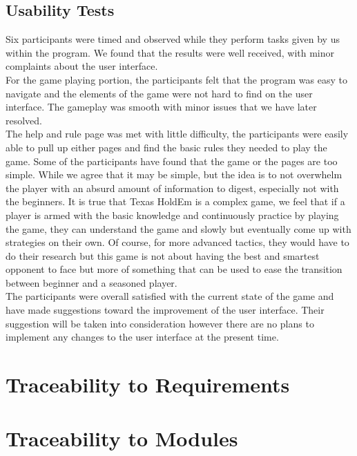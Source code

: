 \documentclass[11pt]{article}
\begin{document}
	\subsection{Usability Tests}
	Six participants were timed and observed while they perform tasks given by us within the program. We found that the results were well received, with minor complaints about the user interface. \\
	\newline
	For the game playing portion, the participants felt that the program was easy to navigate and the elements of the game were not hard to find on the user interface. The gameplay was smooth with minor issues that we have later resolved. \\
	\newline
	The help and rule page was met with little difficulty, the participants were easily able to pull up either pages and find the basic rules they needed to play the game. Some of the participants have found that the game or the pages are too simple. While we agree that it may be simple, but the idea is to not overwhelm the player with an absurd amount of information to digest, especially not with the beginners. It is true that Texas HoldEm is a complex game, we feel that if a player is armed with the basic knowledge and continuously practice by playing the game, they can understand the game and slowly but eventually come up with strategies on their own. Of course, for more advanced tactics, they would have to do their research but this game is not about having the best and smartest opponent to face but more of something that can be used to ease the transition between beginner and a seasoned player. \\
	\newline 
	The participants were overall satisfied with the current state of the game and have made suggestions toward the improvement of the user interface. Their suggestion will be taken into consideration however there are no plans to implement any changes to the user interface at the present time.
	\section{Traceability to Requirements}
	\section{Traceability to Modules}
	
		
\end{document}
